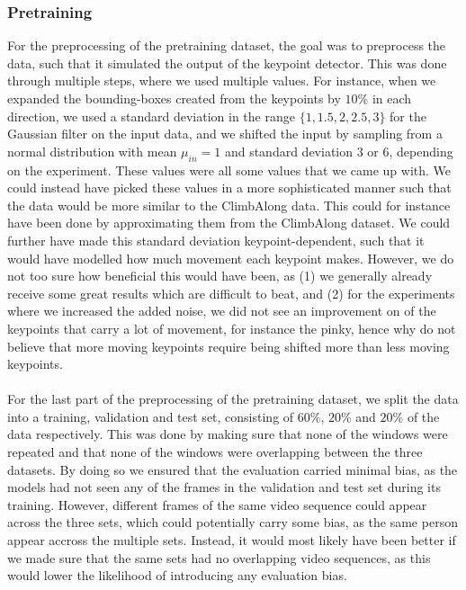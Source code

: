 \documentclass[./main.tex]{subfiles}
\begin{document}
\subsubsection{Pretraining}
For the preprocessing of the pretraining dataset, the goal was to preprocess the data, such that it simulated the output of the keypoint detector. This was done through multiple steps, where we used multiple values. For instance, when we expanded the bounding-boxes created from the keypoints by $10\%$ in each direction, we used a standard deviation in the range $\{1, 1.5, 2, 2.5, 3\}$ for the Gaussian filter on the input data, and we shifted the input by sampling from a normal distribution with mean $\mu_{in} = 1$ and standard deviation $3$ or $6$, depending on the experiment. These values were all some values that we came up with. We could instead have picked these values in a more sophisticated manner such that the data would be more similar to the ClimbAlong data. This could for instance have been done by approximating them from the ClimbAlong dataset. We could further have made this standard deviation keypoint-dependent, such that it would have modelled how much movement each keypoint makes. However, we do not too sure how beneficial this would have been, as (1) we generally already receive some great results which are difficult to beat, and (2) for the experiments where we increased the added noise, we did not see an improvement on of the keypoints that carry a lot of movement, for instance the pinky, hence why do not believe that more moving keypoints require being shifted more than less moving keypoints.
\\
\\
For the last part of the preprocessing of the pretraining dataset, we split the data into a training, validation and test set, consisting of $60\%$, $20\%$ and $20\%$ of the data respectively. This was done by making sure that none of the windows were repeated and that none of the windows were overlapping between the three datasets. By doing so we ensured that the evaluation carried minimal bias, as the models had not seen any of the frames in the validation and test set during its training. However, different frames of the same video sequence could appear across the three sets, which could potentially carry some bias, as the same person appear accross the multiple sets. Instead, it would most likely have been better if we made sure that the same sets had no overlapping video sequences, as this would lower the likelihood of introducing any evaluation bias.
\end{document}
